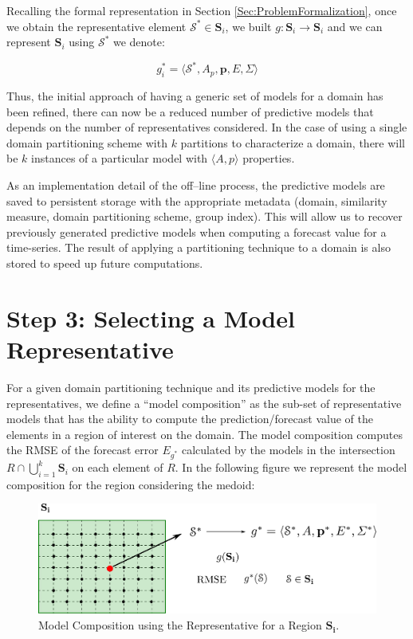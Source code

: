 Recalling the formal representation in Section \ref{Sec:ProblemFormalization}, once we obtain the representative element $\mathcal{S}^{*} \in \mathbf{S}_{i}$, we built $g:\mathbf{S}_{i} \to \mathbf{S}_{i}$ and we can represent $\mathbf{S}_{i}$ using $\mathcal{S}^{*}$ we denote:

\begin{equation}
g^{*}_{i} = \langle \mathcal{S}^{*}, A_p, \mathbf{p}, E, \varSigma \rangle
\end{equation}

Thus, the initial approach of having a generic set of models for a domain has been refined, there can now be a reduced number of predictive models that depends on the number of representatives considered. In the case of using a single domain partitioning scheme with $k$ partitions to characterize a domain, there will be $k$ instances of a particular model with $\langle A, p \rangle$ properties. 

As an implementation detail of the off--line process, the predictive models are saved to persistent storage with the appropriate metadata (domain, similarity measure, domain partitioning scheme, group index). This will allow us to recover previously generated predictive models when computing a forecast value for a time-series. The result of applying a partitioning technique to a domain is also stored to speed up future computations.

\section{Step 3: Selecting a Model Representative}
\label{Sec:KnowledgExtraction}

For a given domain partitioning technique and its predictive models for the representatives, we define a ``model composition'' as the sub-set of representative models that has the ability to compute the prediction/forecast value of the elements in a region of interest on the domain. The model composition computes the RMSE of the forecast error $E_{g^{*}}$ calculated by the models in the intersection $R \cap \bigcup_{i=1}^{k} \mathbf{S}_{i}$ on each element of $R$.  In the following figure we represent the model composition for the region considering the medoid:
\begin{figure}[h]
	\centering
	\includegraphics[scale=0.35]{../Figures/ModelCompositionRegion}
	\caption{Model Composition using the Representative for a Region $\mathbf{S_{i}}$.}
	\label{Fig:ModelRegion}
\end{figure}

